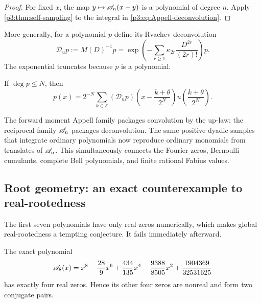 \documentclass[11pt,oneside]{article}
\numberwithin{equation}{section}
\theoremstyle{definition}
\theoremstyle{remark}
\newcommand{\Z}{\mathbb Z}
\begin{document}
\begin{proof}
For fixed $x$, the map $y\mapsto\mathscr A_n(x-y)$ is a polynomial of degree $n$.  Apply \cref{p3:thm:self-sampling} to the integral in \eqref{p3:eq:Appell-deconvolution}.
\end{proof}

More generally, for a polynomial $p$ define its Rvachev deconvolution
\begin{equation}
 \mathscr D_up
 :=M(D)^{-1}p
 =\exp\!\left(-\sum_{r\ge1}\kappa_{2r}
 \frac{D^{2r}}{(2r)!}\right)p.
 \label{p3:eq:polynomial-deconvolution}
\end{equation}
The exponential truncates because $p$ is a polynomial.

\begin{corollary}
\label{p3:cor:polynomial-deconvolution}
If $\deg p\le N$, then
\begin{equation}
 p(x)=2^{-N}\sum_{k\in\Z}
 (\mathscr D_up)\!\left(x-\frac{k+\theta}{2^N}\right)
 u\!\left(\frac{k+\theta}{2^N}\right).
 \label{p3:eq:general-deconvolution-reproduction}
\end{equation}
\end{corollary}

\begin{resultbox}
The forward moment Appell family packages convolution by the up-law; the reciprocal family $\mathscr A_n$ packages deconvolution.  The same positive dyadic samples that integrate ordinary polynomials now reproduce ordinary monomials from translates of $\mathscr A_n$.  This simultaneously connects the Fourier zeros, Bernoulli cumulants, complete Bell polynomials, and finite rational Fabius values.
\end{resultbox}

\subsection{Root geometry: an exact counterexample to real-rootedness}

The first seven polynomials have only real zeros numerically, which makes global real-rootedness a tempting conjecture.  It fails immediately afterward.

\begin{proposition}
\label{p3:prop:A8-roots}
The exact polynomial
\begin{equation}
 \mathscr A_8(x)
 =x^8-\frac{28}{9}x^6+\frac{434}{135}x^4
 -\frac{9388}{8505}x^2+\frac{1904369}{32531625}
 \label{p3:eq:A8}
\end{equation}
has exactly four real zeros.  Hence its other four zeros are nonreal and form two conjugate pairs.
\end{proposition}
\end{document}
